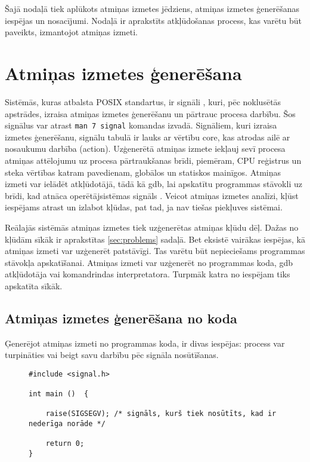 ﻿Šajā nodaļā tiek aplūkots atmiņas izmetes jēdziens, atmiņas izmetes ģenerēšanas iespējas un nosacījumi.
Nodaļā ir aprakstīts atkļūdošanas process, kas varētu būt paveikts, izmantojot atmiņas izmeti.

 \section{Atmiņas izmetes ģenerēšana}
Sistēmās, kuras atbalsta POSIX standartus, ir signāli \cite{USP}, kuri, pēc noklusētās apstrādes, izraisa atmiņas izmetes ģenerēšanu un pārtrauc procesa darbību. 
Šos signālus var atrast  \texttt{man 7 signal} komandas izvadā. 
Signāliem, kuri izraisa izmetes ģenerēšanu, signālu tabulā \cite{signal} ir lauks ar vērtību core, kas atrodas ailē ar nosaukumu darbība (action). 
Uzģenerētā atmiņas izmete iekļauj sevī procesa atmiņas attēlojumu uz procesa pārtraukšanas brīdi, piemēram, CPU reģistrus un steka vērtības katram pavedienam, globālos un statiskos mainīgos. 
Atmiņas izmeti var ielādēt atkļūdotājā, tādā kā gdb, lai  apskatītu programmas stāvokli uz brīdi, kad atnāca operētājsistēmas signāls \cite{core}.
Veicot atmiņas izmetes analīzi, kļūst iespējams atrast un izlabot kļūdas, pat tad, ja nav tiešas piekļuves sistēmai. 

Reālajās sistēmās atmiņas izmetes tiek uzģenerētas atmiņas kļūdu dēļ. 
Dažas no kļūdām sīkāk ir aprakstītas \ref{sec:problems} sadaļā. 
Bet eksistē vairākas iespējas, kā atmiņas izmeti var uzģenerēt patstāvīgi.
Tas varētu būt nepieciešams programmas stāvokļa apskatīšanai.
Atmiņas izmeti var uzģenerēt no programmas koda,  gdb atkļūdotāja vai komandrindas interpretatora.
Turpmāk katra no iespējam tiks apskatīta sīkāk.

\subsection{Atmiņas izmetes ģenerēšana no koda}
Ģenerējot atmiņas izmeti no programmas koda, ir divas iespējas: process var turpināties vai beigt savu darbību pēc signāla nosūtīšanas.
\begin{figure}[h]
\begin{lstlisting}
#include <signal.h>

int main ()  {

    raise(SIGSEGV); /* signāls, kurš tiek nosūtīts, kad ir nederīga norāde */
	
    return 0;
}
\end{lstlisting}
\caption{\textbf{\fontsize{11}{12}\selectfont {Atmiņas izmetes ģenerēšana, pārtraucot procesa darbību}}}
\end{figure}

